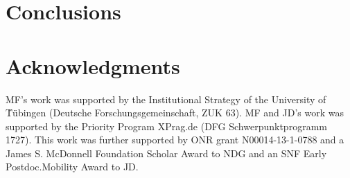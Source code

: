 \documentclass[10pt,letterpaper]{article}
\begin{document}
\section{Conclusions}


\section{Acknowledgments}

MF's work was supported by the Institutional Strategy of the University of T̈\"{u}bingen (Deutsche
Forschungsgemeinschaft, ZUK 63). MF and JD's work was supported by the Priority Program XPrag.de (DFG Schwerpunktprogramm
1727). This work was further supported by ONR grant N00014-13-1-0788 and a James S. McDonnell Foundation Scholar Award to NDG and an SNF Early Postdoc.Mobility Award to JD.





\setlength{\bibleftmargin}{.125in}
\setlength{\bibindent}{-\bibleftmargin}


\end{document}
